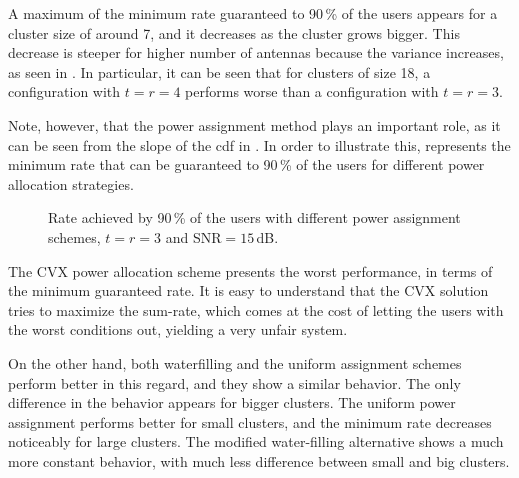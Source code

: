 A maximum of the minimum rate guaranteed to 90\,\% of the users appears for a
cluster size of around 7, and it decreases as the cluster grows bigger. This
decrease is steeper for higher number of antennas because the variance
increases, as seen in . In particular, it can be seen
that for clusters of size 18, a configuration with $t=r=4$ performs worse than a
configuration with $t=r=3$.

Note, however, that the power assignment method plays an important role, as it
can be seen from the slope of the \gls{cdf} in . In
order to illustrate this,  represents the minimum
rate that can be guaranteed to 90\,\% of the users for different power
allocation strategies.

\begin{figure}[t]
\begin{center}
    \hspace*{1mm}
\end{center}
\caption{Rate achieved by 90\,\% of the users with different power assignment
schemes, $t=r=3$ and SNR$=15$\,dB.}
\label{fig:min_rate_power_alloc}
\end{figure}

The CVX power allocation scheme presents the worst performance, in terms of
the minimum guaranteed rate. It is easy to understand that the CVX solution
tries to maximize the sum-rate, which comes at the cost of letting the users
with the worst conditions out, yielding a very unfair system.

On the other hand, both waterfilling and the uniform assignment schemes perform
better in this regard, and they show a similar behavior. The only difference in
the behavior appears for bigger clusters. The uniform power assignment performs
better for small clusters, and the minimum rate decreases noticeably for large
clusters. The modified water-filling alternative shows a much more constant
behavior, with much less difference between small and big clusters.
